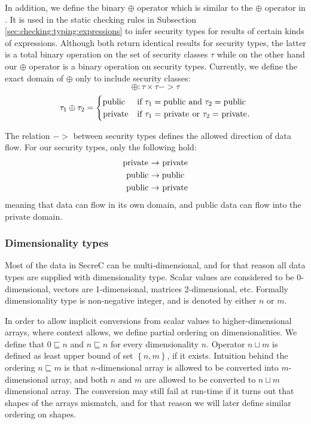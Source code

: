 \documentclass[a4paper, 10pt, draft]{report}
\newcommand{\mycode}[1]{\ensuremath{\mbox{\lstinline{#1}}}}
\begin{document}
In addition, we define the binary $\oplus$ operator which is similar to the
$\oplus$ operator in \cite{DENNING76}. It is used in the static checking rules
in Subsection \ref{sec:checking:typing:expressions} to infer security types for
results of certain kinds of expressions. Although both return identical results
for security types, the latter is a total binary operation on the set of
security classes $\tau$ while on the other hand our $\oplus$ operator is a
binary operation on security types. Currently, we define the exact domain of
$\oplus$ only to include security classes:
\[
  \oplus : \tau \times \tau -> \tau
\]\[
\tau_1 \oplus \tau_2 = \begin{cases}
    \mycode{public}  &
      \text{if $\tau_1 = \mycode{public}$ and $\tau_2 = \mycode{public}$} \\
    \mycode{private} &
      \text{if $\tau_1 = \mycode{private}$ or $\tau_2 = \mycode{private}$}. \\
  \end{cases}
\]

The relation $->$ between security types defines the allowed direction of data
flow. For our security types, only the following hold:
\begin{align*}
  \mycode{private} & -> \mycode{private} \\
  \mycode{public}  & -> \mycode{public} \\
  \mycode{public}  & -> \mycode{private}
\end{align*}
meaning that data can flow in its own domain, and public data can flow into the
private domain.

\subsubsection{Dimensionality types}

Most of the data in SecreC can be multi-dimensional, and for that reason all
data types are supplied with dimensionality type. Scalar values are considered
to be 0-dimensional, vectors are 1-dimensional, matrices 2-dimensional, etc.
Formally dimensionality type is non-negative integer, and is denoted by either
$n$ or $m$.

In order to allow implicit conversions from scalar values to higher-dimensional
arrays, where context allows, we define partial ordering on dimensionalities.
We define that $0 \sqsubseteq n$ and $n \sqsubseteq n$ for every dimensionality
$n$.  Operator $n \sqcup m$ is defined as least upper bound of set $\left\{ n,
m \right\}$, if it exists. Intuition behind the ordering $n \sqsubseteq m$ is
that $n$-dimensional array is allowed to be converted into $m$-dimensional
array, and both $n$ and $m$ are allowed to be converted to $n \sqcup m$
dimensional array. The conversion may still fail at run-time if it turns out
that shapes of the arrays mismatch, and for that reason we will later define
similar ordering on shapes.
\end{document}
